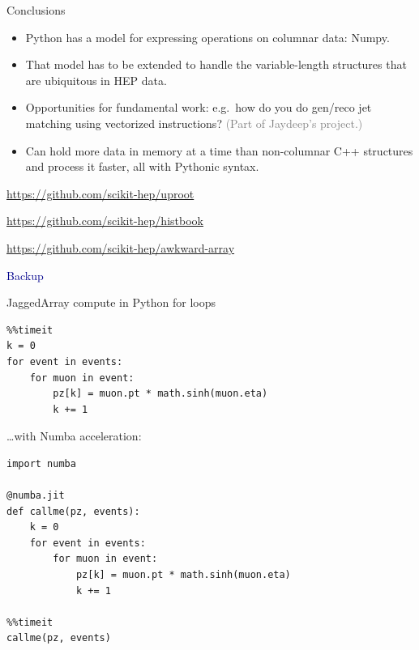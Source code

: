 \documentclass[aspectratio=169]{beamer}
\begin{document}
\begin{frame}{Conclusions}
\vspace{0.5 cm}
\large
\begin{itemize}\setlength{\itemsep}{0.5 cm}
\item Python has a model for expressing operations on columnar data: Numpy.
\item That model has to be extended to handle the variable-length structures that are ubiquitous in HEP data.
\item Opportunities for fundamental work: e.g.\ how do you do gen/reco jet matching using vectorized instructions? \textcolor{gray}{(Part of Jaydeep's project.)}
\item Can hold more data in memory at a time than non-columnar C++ structures and process it faster, all with Pythonic syntax.
\end{itemize}

\vspace{0.25 cm}
\begin{center}
\begin{minipage}{0.67\linewidth}
\small
\textcolor{blue}{\url{https://github.com/scikit-hep/uproot}}

\textcolor{blue}{\url{https://github.com/scikit-hep/histbook}}

\textcolor{blue}{\url{https://github.com/scikit-hep/awkward-array}}
\end{minipage}
\end{center}
\end{frame}

\begin{frame}
\huge
\begin{center}
\textcolor{darkblue}{Backup}
\end{center}
\end{frame}

\begin{frame}[fragile]{JaggedArray compute in Python for loops}
\vspace{0.3 cm}
\scriptsize
\begin{verbatim}
%%timeit
k = 0
for event in events:
    for muon in event:
        pz[k] = muon.pt * math.sinh(muon.eta)
        k += 1
\end{verbatim}

\vspace{0.5 cm}
\hfill\begin{minipage}{0.6\linewidth}
{\normalsize \ldots with Numba acceleration:}
\begin{verbatim}
import numba

@numba.jit
def callme(pz, events):
    k = 0
    for event in events:
        for muon in event:
            pz[k] = muon.pt * math.sinh(muon.eta)
            k += 1

%%timeit
callme(pz, events)
\end{verbatim}
\end{minipage}
\end{frame}
\end{document}

